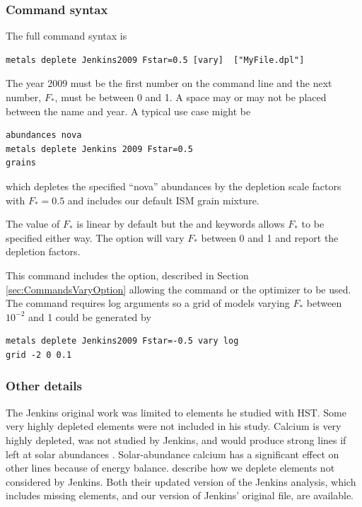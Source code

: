 \subsubsection{Command syntax}

The full command syntax is
\begin{verbatim}
metals deplete Jenkins2009 Fstar=0.5 [vary]  ["MyFile.dpl"]
\end{verbatim}
The year 2009 must be the first number on the command line and the next number, $F_*$,
must be between 0 and 1.
A space may or may not be placed between the name and year.
A typical use case might be
\begin{verbatim}
abundances nova
metals deplete Jenkins 2009 Fstar=0.5
grains
\end{verbatim}
which depletes the specified ``nova'' abundances by the \citet{2009ApJ...700.1299J}
depletion scale factors with $F_* = 0.5$ and includes our default ISM grain mixture.

The value of $F_*$ is linear by default but
the  and  keywords allows
$F_*$ to be specified either way.
 The  option will vary $F_*$ between 0 and 1 and report the depletion factors.

This command includes the  option, described in Section \ref{sec:CommandsVaryOption}
allowing the  command
 or the  optimizer to be used.
 The   command requires log arguments so a grid of models
 varying $F_*$ between $10^{-2}$ and 1 could be generated by
 \begin{verbatim}
metals deplete Jenkins2009 Fstar=-0.5 vary log
grid -2 0 0.1 
\end{verbatim}
 

\subsubsection{Other details}

 The Jenkins original work was limited to elements he studied with HST.  
 Some very highly depleted elements were not included in his study.
 Calcium is very highly depleted, was not studied by Jenkins, and would 
 produce strong lines if left at solar abundances
 \citep{KingdonFerlandFeibelman1995} .  Solar-abundance calcium has a significant
effect on other lines because of energy balance.
\citet{2022MNRAS.512.2310G, 2023MNRAS.520.4345G}
describe how we deplete elements not considered by Jenkins.
Both their updated version of the Jenkins analysis, which includes  missing elements, and our
version of Jenkins' original file, are available. 

